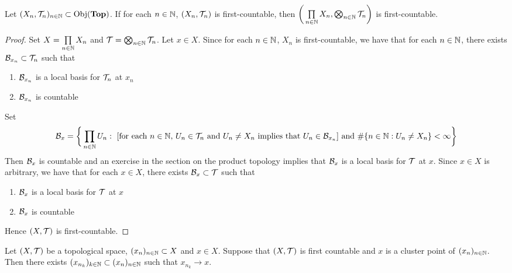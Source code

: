 \documentclass{book}
\begin{document}
	
	\begin{ex} 
		Let $(X_n, \mathcal{T}_n)_{n \in \mathbb{N}} \subset \operatorname{Obj}(\operatorname*{\text{\textbf{Top}}})$. If for each $n \in \mathbb{N}$, $(X_n, \mathcal{T}_n)$ is first-countable, then $\bigg( \prod\limits_{n \in \mathbb{N}} X_n, \bigotimes_{n \in \mathbb{N}} \mathcal{T}_n \bigg)$ is first-countable. 
	\end{ex}

	\begin{proof}
		Set $X = \prod\limits_{n \in \mathbb{N}} X_n$ and $\mathcal{T} = \bigotimes_{n \in \mathbb{N}} \mathcal{T}_n$. Let $x \in X$. Since for each $n \in \mathbb{N}$, $X_n$ is first-countable, we have that for each $n \in \mathbb{N}$, there exists $\mathcal{B}_{x_n} \subset \mathcal{T}_n$ such that  
		\begin{enumerate}
			\item $\mathcal{B}_{x_n}$ is a local basis for $\mathcal{T}_n$ at $x_n$
			\item $\mathcal{B}_{x_n}$ is countable
		\end{enumerate}
		Set 
		$$\mathcal{B}_x = \bigg \{\prod_{n \in \mathbb{N}} U_n: \text{ [for each $n \in \mathbb{N}$, $U_n \in \mathcal{T}_n$ and $U_n \neq X_n$ implies that $U_n \in \mathcal{B}_{x_n}$] and $\# \{n \in \mathbb{N}: U_n \neq X_n\} < \infty$} \bigg\}$$
		Then $\mathcal{B}_x$ is countable and an exercise in the section on the product topology implies that $\mathcal{B}_x$ is a local basis for $\mathcal{T}$ at $x$. Since $x \in X$ is arbitrary, we have that for each $x \in X$, there exists $\mathcal{B}_x \subset \mathcal{T}$ such that 
		\begin{enumerate}
			\item $\mathcal{B}_x$ is a local basis for $\mathcal{T}$ at $x$
			\item $\mathcal{B}_x$ is countable
		\end{enumerate}
		Hence $(X, \mathcal{T})$ is first-countable.
	\end{proof}


	\begin{ex} 
		Let $(X, \mathcal{T})$ be a topological space, $(x_n)_{n \in \mathbb{N}} \subset X$ and $x \in X$. Suppose that $(X, \mathcal{T})$ is first countable and $x$ is a cluster point of $(x_n)_{n \in \mathbb{N}}$. Then there exists $(x_{n_k})_{k \in \mathbb{N}} \subset (x_n)_{n \in \mathbb{N}}$ such that $x_{n_k} \rightarrow x$. 
	\end{ex}
\end{document}
